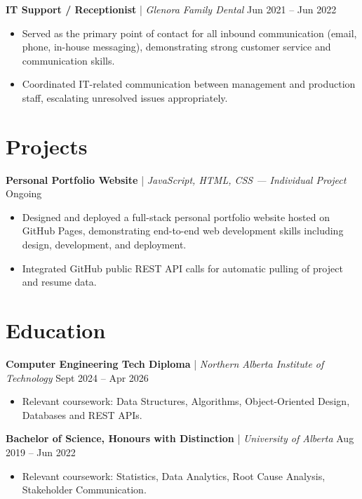 \documentclass[11pt, letterpaper]{article}
\begin{document}
\textbf{IT Support / Receptionist} | \textit{Glenora Family Dental} \hfill Jun 2021 -- Jun 2022

\begin{itemize}
    \item Served as the primary point of contact for all inbound communication (email, phone, in-house messaging), demonstrating strong customer service and communication skills.
    \item Coordinated IT-related communication between management and production staff, escalating unresolved issues appropriately.
\end{itemize}

\section{Projects}

\textbf{Personal Portfolio Website} | \textit{JavaScript, HTML, CSS --- Individual Project}  \hfill Ongoing
\begin{itemize}
    \item Designed and deployed a full-stack personal portfolio website hosted on GitHub Pages, demonstrating end-to-end web development skills including design, development, and deployment.
    \item Integrated GitHub public REST API calls for automatic pulling of project and resume data.
\end{itemize}

\section{Education}

\textbf{Computer Engineering Tech Diploma} | \textit{Northern Alberta Institute of Technology}  \hfill Sept 2024 -- Apr 2026

\begin{itemize}
    \item Relevant coursework: Data Structures, Algorithms, Object-Oriented Design, Databases and REST APIs.
\end{itemize}

\textbf{Bachelor of Science, Honours with Distinction} | \textit{University of Alberta}  \hfill Aug 2019 -- Jun 2022

\begin{itemize}
    \item Relevant coursework: Statistics, Data Analytics, Root Cause Analysis, Stakeholder Communication. 
\end{itemize}
\end{document}

